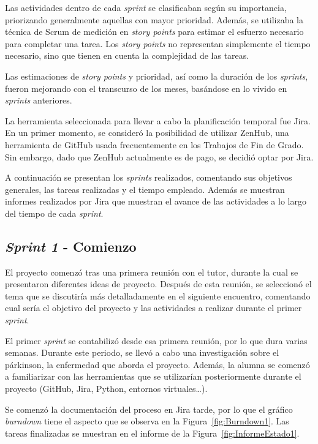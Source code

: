 Las actividades dentro de cada \textit{sprint} se clasificaban según su importancia, priorizando generalmente aquellas con mayor prioridad. Además, se utilizaba la técnica de Scrum de medición en \textit{story points} para estimar el esfuerzo necesario para completar una tarea. Los \textit{story points} no representan simplemente el tiempo necesario, sino que tienen en cuenta la complejidad de las tareas. 

Las estimaciones de \textit{story points} y prioridad, así como la duración de los \textit{sprints}, fueron mejorando con el transcurso de los meses, basándose en lo vivido en \textit{sprints} anteriores.

La herramienta seleccionada para llevar a cabo la planificación temporal fue Jira. En un primer momento, se consideró la posibilidad de utilizar ZenHub, una herramienta de GitHub usada frecuentemente en los Trabajos de Fin de Grado. Sin embargo, dado que ZenHub actualmente es de pago, se decidió optar por Jira.

A continuación se presentan los \textit{sprints} realizados, comentando sus objetivos generales, las tareas realizadas y el tiempo empleado. Además se muestran informes realizados por Jira que muestran el avance de las actividades a lo largo del tiempo de cada \textit{sprint}.


\subsection{\textit{Sprint 1} - Comienzo}
El proyecto comenzó tras una primera reunión con el tutor, durante la cual se presentaron diferentes ideas de proyecto. Después de esta reunión, se seleccionó el tema que se discutiría más detalladamente en el siguiente encuentro, comentando cual sería el objetivo del proyecto y las actividades a realizar durante el primer \textit{sprint}.

El primer \textit{sprint} se contabilizó desde esa primera reunión, por lo que dura varias semanas. Durante este periodo, se llevó a cabo una investigación sobre el párkinson, la enfermedad que aborda el proyecto. Además, la alumna se comenzó a familiarizar con las herramientas que se utilizarían posteriormente durante el proyecto (GitHub, Jira, Python, entornos virtuales\ldots).

Se comenzó la documentación del proceso en Jira tarde, por lo que el gráfico \textit{burndown} tiene el aspecto que se observa en la Figura~\ref{fig:Burndown1}. Las tareas finalizadas se muestran en el informe de la Figura~\ref{fig:InformeEstado1}.


